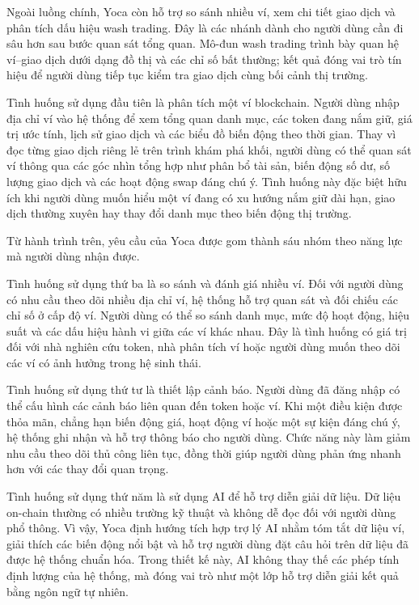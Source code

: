 Ngoài luồng chính, Yoca còn hỗ trợ so sánh nhiều ví, xem chi tiết giao dịch và phân tích dấu hiệu wash trading. Đây là các nhánh dành cho người dùng cần đi sâu hơn sau bước quan sát tổng quan. Mô-đun wash trading trình bày quan hệ ví--giao dịch dưới dạng đồ thị và các chỉ số bất thường; kết quả đóng vai trò tín hiệu để người dùng tiếp tục kiểm tra giao dịch cùng bối cảnh thị trường.

Tình huống sử dụng đầu tiên là phân tích một ví blockchain. Người dùng nhập địa chỉ ví vào hệ thống để xem tổng quan danh mục, các token đang nắm giữ, giá trị ước tính, lịch sử giao dịch và các biểu đồ biến động theo thời gian. Thay vì đọc từng giao dịch riêng lẻ trên trình khám phá khối, người dùng có thể quan sát ví thông qua các góc nhìn tổng hợp như phân bổ tài sản, biến động số dư, số lượng giao dịch và các hoạt động swap đáng chú ý. Tình huống này đặc biệt hữu ích khi người dùng muốn hiểu một ví đang có xu hướng nắm giữ dài hạn, giao dịch thường xuyên hay thay đổi danh mục theo biến động thị trường.

Từ hành trình trên, yêu cầu của Yoca được gom thành sáu nhóm theo năng lực mà người dùng nhận được.

Tình huống sử dụng thứ ba là so sánh và đánh giá nhiều ví. Đối với người dùng có nhu cầu theo dõi nhiều địa chỉ ví, hệ thống hỗ trợ quan sát và đối chiếu các chỉ số ở cấp độ ví. Người dùng có thể so sánh danh mục, mức độ hoạt động, hiệu suất và các dấu hiệu hành vi giữa các ví khác nhau. Đây là tình huống có giá trị đối với nhà nghiên cứu token, nhà phân tích ví hoặc người dùng muốn theo dõi các ví có ảnh hưởng trong hệ sinh thái.

Tình huống sử dụng thứ tư là thiết lập cảnh báo. Người dùng đã đăng nhập có thể cấu hình các cảnh báo liên quan đến token hoặc ví. Khi một điều kiện được thỏa mãn, chẳng hạn biến động giá, hoạt động ví hoặc một sự kiện đáng chú ý, hệ thống ghi nhận và hỗ trợ thông báo cho người dùng. Chức năng này làm giảm nhu cầu theo dõi thủ công liên tục, đồng thời giúp người dùng phản ứng nhanh hơn với các thay đổi quan trọng.

Tình huống sử dụng thứ năm là sử dụng AI để hỗ trợ diễn giải dữ liệu. Dữ liệu on-chain thường có nhiều trường kỹ thuật và không dễ đọc đối với người dùng phổ thông. Vì vậy, Yoca định hướng tích hợp trợ lý AI nhằm tóm tắt dữ liệu ví, giải thích các biến động nổi bật và hỗ trợ người dùng đặt câu hỏi trên dữ liệu đã được hệ thống chuẩn hóa. Trong thiết kế này, AI không thay thế các phép tính định lượng của hệ thống, mà đóng vai trò như một lớp hỗ trợ diễn giải kết quả bằng ngôn ngữ tự nhiên.


